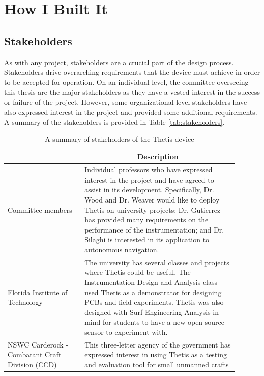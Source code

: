 \chapter{How I Built It} 

\section{Stakeholders} 
As with any project, stakeholders are a crucial part of the design process.
Stakeholders drive overarching requirements that the device must achieve in order to be accepted for operation.
On an individual level, the committee overseeing this thesis are the major stakeholders as they have a vested interest in the success or failure of the project.
However, some organizational-level stakeholders have also expressed interest in the project and provided some additional requirements.
A summary of the stakeholders is provided in Table \ref{tab:stakeholders}.

\begin{table}
	\caption{A summary of stakeholders of the Thetis device}
	\centering
	\begin{tabular}{|p{0.3\linewidth} | p{0.6\linewidth}|}
		\hline
		\rowcolor[gray]{0.8}
		\multicolumn{1}{|c|}{\textbf{Stakeholder}} & \multicolumn{1}{|c|}{\textbf{Description}} \\
		\hline
		Committee members & Individual professors who have expressed interest in the project and have agreed to assist in its development. Specifically, Dr. Wood and Dr. Weaver would like to deploy Thetis on university projects; Dr. Gutierrez has provided many requirements on the performance of the instrumentation; and Dr. Silaghi is interested in its application to autonomous navigation. \\
		\hline
		Florida Institute of \newline Technology & The university has several classes and projects where Thetis could be useful. The Instrumentation Design and Analysis class used Thetis as a demonstrator for designing PCBs and field experiments. Thetis was also designed with Surf Engineering Analysis in mind for students to have a new open source sensor to experiment with. \\
		\hline
		NSWC Carderock - \newline Combatant Craft Division (CCD) & This three-letter agency of the government has expressed interest in using Thetis as a testing and evaluation tool for small unmanned crafts \\
		\hline
	\end{tabular}
\end{table}

